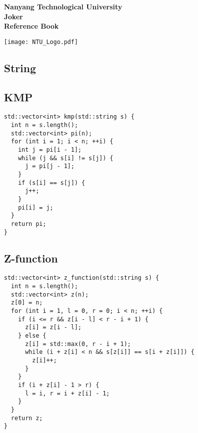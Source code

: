 \documentclass[9pt,landscape]{article}
\begin{document}
\thispagestyle{empty}
\null\vfill
\begin{center}
  \Huge \textbf{Nanyang Technological University \\Joker \\Reference Book}

\vspace{1.5cm}

\texttt{[image: NTU\_Logo.pdf]}
\end{center}
\vfill
\clearpage

\begin{multicols}{2}
\tableofcontents
\end{multicols}

\newpage

\begin{multicols}{2}

\columnseprule=0.25pt

\section{String}

\subsection{KMP}

\begin{lstlisting}
std::vector<int> kmp(std::string s) {
  int n = s.length();
  std::vector<int> pi(n);
  for (int i = 1; i < n; ++i) {
    int j = pi[i - 1];
    while (j && s[i] != s[j]) {
      j = pi[j - 1];
    }
    if (s[i] == s[j]) {
      j++;
    }
    pi[i] = j;
  }
  return pi;
}
\end{lstlisting}

\subsection{Z-function}

\begin{lstlisting}
std::vector<int> z_function(std::string s) {
  int n = s.length();
  std::vector<int> z(n);
  z[0] = n;
  for (int i = 1, l = 0, r = 0; i < n; ++i) {
    if (i <= r && z[i - l] < r - i + 1) {
      z[i] = z[i - l];
    } else {
      z[i] = std::max(0, r - i + 1);
      while (i + z[i] < n && s[z[i]] == s[i + z[i]]) {
        z[i]++;
      }
    }
    if (i + z[i] - 1 > r) {
      l = i, r = i + z[i] - 1;
    }
  }
  return z;
}
\end{lstlisting}


\end{multicols}
\end{document}
